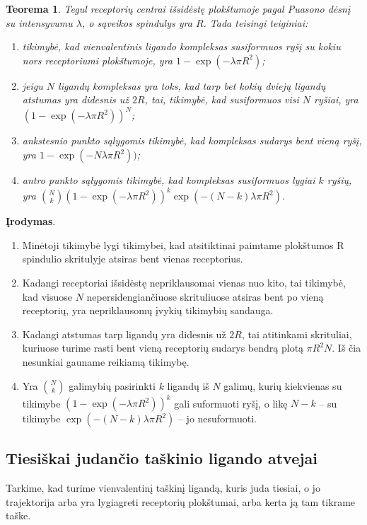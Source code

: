 \documentclass[10pt]{article}
\newtheorem{thm}{Teorema}
\begin{document}
\begin{thm}\label{thm:1}
Tegul receptorių centrai išsidėstę plokštumoje  pagal Puasono dėsnį su intensyvumu $\lambda$, o sąveikos spindulys yra $R$. Tada teisingi teiginiai:
\begin{enumerate}
	\item tikimybė, kad vienvalentinis ligando kompleksas susiformuos ryšį su kokiu nors receptoriumi plokštumoje, yra $1-\exp(-\lambda \pi R^{2})$;
	\item jeigu $N$ ligandų kompleksas yra toks, kad tarp bet kokių dviejų ligandų atstumas  yra didesnis už $2R$, tai, tikimybė, kad susiformuos  visi $N$ ryšiai,  yra $(1-\exp(-\lambda \pi R^{2}))^N$;
	\item ankstesnio punkto  sąlygomis  tikimybė, kad kompleksas  sudarys bent vieną ryšį, yra 
	$1-\exp(-N \lambda \pi R^{2}))$;
	\item antro punkto sąlygomis tikimybė, kad kompleksas susiformuos lygiai $k$ ryšių, yra 
	 $ \binom{N}{k} \left( 1-\exp(-\lambda \pi R^{2}) \right) ^ k \exp(-(N-k) \lambda \pi R^{2})  $. 
	
	
\end{enumerate}
\end{thm}
\textbf{Įrodymas}. 
\begin{enumerate}
\item  Minėtoji tikimybė lygi tikimybei, kad atsitiktinai paimtame plokštumos   R spindulio skritulyje atsiras bent vienas receptorius.
\item Kadangi receptoriai išsidėstę nepriklausomai vienas nuo kito, tai tikimybė, kad  visuose $N$ nepersidengiančiuose skrituliuose atsiras bent po vieną receptorių, yra nepriklausomų įvykių tikimybių sandauga.
\item Kadangi atstumas tarp ligandų yra didesnis už $2R$, tai atitinkami skrituliai, kuriuose turime rasti bent vieną receptorių sudarys bendrą plotą $\pi R^2 N $. Iš čia nesunkiai gauname reikiamą tikimybę.
\item Yra  $\binom {N}{k}$ galimybių pasirinkti $k$ ligandų iš $N$ galimų,  kurių kiekvienas su tikimybe $\left( 1-\exp(-\lambda \pi R^{2}) \right) ^ k$ gali suformuoti ryšį, o likę $ N - k $ -- su tikimybe $\exp(-(N-k) \lambda \pi R^{2})$ -- jo nesuformuoti. 
\end{enumerate}


\subsection{Tiesiškai judančio taškinio ligando atvejai}
Tarkime, kad turime vienvalentinį taškinį ligandą, kuris juda tiesiai, o jo trajektorija arba yra lygiagreti receptorių plokštumai, arba kerta ją tam tikrame taške.
\end{document}
